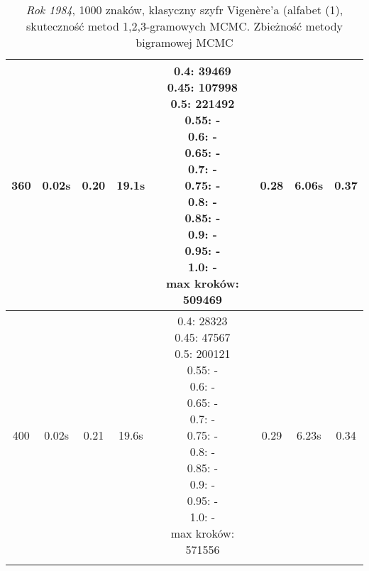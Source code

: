 \documentclass[a4paper]{article}
\theoremstyle{defn}
\theoremstyle{theorem}
\theoremstyle{lemma}
\theoremstyle{cor}
\theoremstyle{fact}
\begin{document}
\begin{center}
\begin{tiny}
\begin{longtable}{|c|c|c|c|c|c|c|c|}
360 & 0.02s & 0.20 & 19.1s & \makecell{0.4: 39469\\0.45: 107998\\0.5: 221492\\0.55: -\\0.6: -\\0.65: -\\0.7: -\\0.75: -\\0.8: -\\0.85: -\\0.9: -\\0.95: -\\1.0: -\\ max kroków: 509469} & 0.28 & 6.06s & 0.37 \\ \hline
400 & 0.02s & 0.21 & 19.6s & \makecell{0.4: 28323\\0.45: 47567\\0.5: 200121\\0.55: -\\0.6: -\\0.65: -\\0.7: -\\0.75: -\\0.8: -\\0.85: -\\0.9: -\\0.95: -\\1.0: -\\ max kroków: 571556} & 0.29 & 6.23s & 0.34 \\ \hline
\caption{\textit{Rok 1984}, 1000 znaków, klasyczny szyfr Vigenère'a (alfabet (1), skuteczność metod 1,2,3-gramowych MCMC. Zbieżność metody bigramowej MCMC}
\end{longtable}\end{tiny}\end{center}
\end{document}
